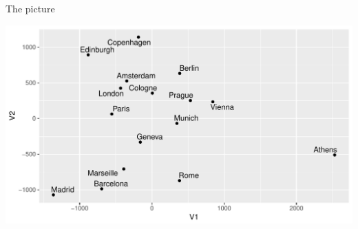 \begin{frame}[fragile]{The picture}
  
\begin{knitrout}
\color{fgcolor}\begin{kframe}
\begin{alltt}
\end{alltt}
\end{kframe}
\includegraphics[width=\maxwidth]{figure/piaacenza-1} 

\end{knitrout}

  
\end{frame}

